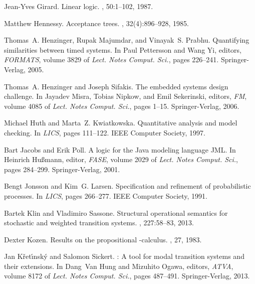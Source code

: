 \documentclass[twocolumn]{svjour3-dummy}
\begin{document}
\begin{thebibliography}{10}
Jean-Yves Girard.
\newblock Linear logic.
, 50:1--102, 1987.

Matthew Hennessy.
\newblock Acceptance trees.
, 32(4):896--928, 1985.

Thomas~A. Henzinger, Rupak Majumdar, and Vinayak~S. Prabhu.
\newblock Quantifying similarities between timed systems.
\newblock In Paul Pettersson and Wang Yi, editors, {\em FORMATS}, volume 3829
  of {\em {Lect. Notes Comput. Sci.}}, pages 226--241. {Springer-Verlag}, 2005.

Thomas~A. Henzinger and Joseph Sifakis.
\newblock The embedded systems design challenge.
\newblock In Jayadev Misra, Tobias Nipkow, and Emil Sekerinski, editors, {\em
  FM}, volume 4085 of {\em {Lect. Notes Comput. Sci.}}, pages 1--15.
  {Springer-Verlag}, 2006.

Michael Huth and Marta~Z. Kwiatkowska.
\newblock Quantitative analysis and model checking.
\newblock In {\em LICS}, pages 111--122. IEEE Computer Society, 1997.

Bart Jacobs and Erik Poll.
\newblock A logic for the {J}ava modeling language {JML}.
\newblock In Heinrich Hu{\ss}mann, editor, {\em FASE}, volume 2029 of {\em
  {Lect. Notes Comput. Sci.}}, pages 284--299. {Springer-Verlag}, 2001.

Bengt Jonsson and Kim~G. Larsen.
\newblock Specification and refinement of probabilistic processes.
\newblock In {\em LICS}, pages 266--277. IEEE Computer Society, 1991.

Bartek Klin and Vladimiro Sassone.
\newblock Structural operational semantics for stochastic and weighted
  transition systems.
, 227:58--83, 2013.

Dexter Kozen.
\newblock Results on the propositional -calculus.
, 27, 1983.

Jan K{\v r}et\'{\i}nsk{\'y} and Salomon Sickert.
: A tool for modal transition systems and their extensions.
\newblock In Dang~Van Hung and Mizuhito Ogawa, editors, {\em ATVA}, volume 8172
  of {\em {Lect. Notes Comput. Sci.}}, pages 487--491. {Springer-Verlag}, 2013.


\end{thebibliography}
\end{document}

